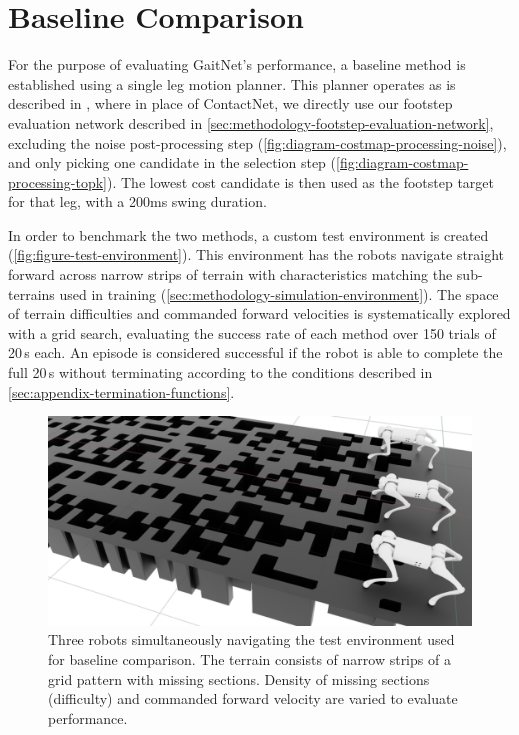 \section{Baseline Comparison}
\label{sec:results-baseline-comparison}

For the purpose of evaluating GaitNet's performance, a baseline
method is established using a single leg motion planner. This planner
operates as is described in \cite{bratta_contactnet_2024}, where in
place of ContactNet, we directly use our footstep evaluation network
described in \autoref{sec:methodology-footstep-evaluation-network},
excluding the noise post-processing step
(\autoref{fig:diagram-costmap-processing-noise}), and only picking
one candidate in the selection step
(\autoref{fig:diagram-costmap-processing-topk}). The lowest cost
candidate is then used as the footstep target for that leg, with a
200ms swing duration.

In order to benchmark the two methods, a custom test environment is
created (\autoref{fig:figure-test-environment}). This environment has
the robots navigate straight forward across narrow strips of terrain
with characteristics matching the sub-terrains used in training
(\autoref{sec:methodology-simulation-environment}).  The space of
terrain difficulties and commanded forward velocities is
systematically explored with a grid search, evaluating the success
rate of each method over 150 trials of 20\,s each. An episode is
considered successful if the robot is able to complete the full 20\,s
without terminating according to the conditions described in
\autoref{sec:appendix-termination-functions}.

\begin{figure}[H]
  \centering
  \includegraphics[width=\textwidth]{images/figures/test-environment.png}
  \caption{Three robots simultaneously navigating the test environment
    used for baseline comparison. The terrain consists of narrow strips
    of a grid pattern with missing sections. Density of missing
    sections     (difficulty) and commanded forward velocity are varied
  to evaluate performance.}
  \label{fig:figure-test-environment}
\end{figure}

